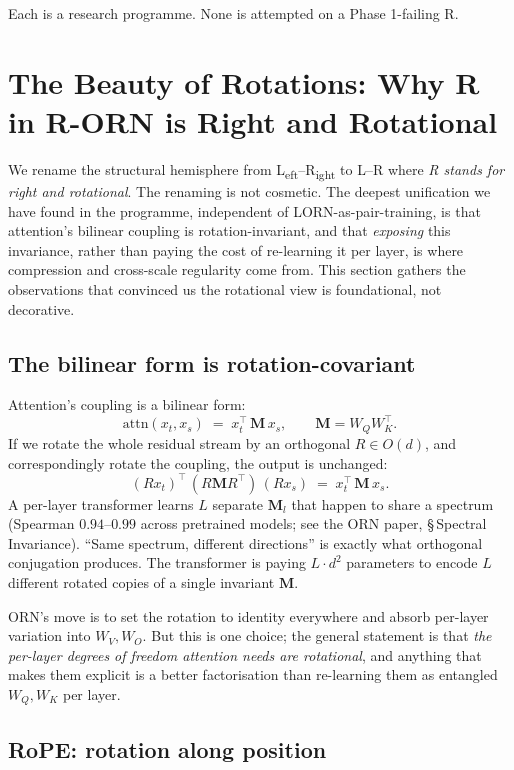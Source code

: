 \documentclass[10pt, twocolumn, a4paper]{article}
\newcommand{\M}{\mathbf{M}}
\begin{document}
Each is a research programme. None is attempted on a Phase 1-failing R.


\section{The Beauty of Rotations: Why R in R-ORN is Right and Rotational}
\label{sec:rotations}

We rename the structural hemisphere from L\textsubscript{eft}--R\textsubscript{ight} to L--R where \emph{R stands for right and rotational}. The renaming is not cosmetic. The deepest unification we have found in the programme, independent of LORN-as-pair-training, is that attention's bilinear coupling is rotation-invariant, and that \emph{exposing} this invariance, rather than paying the cost of re-learning it per layer, is where compression and cross-scale regularity come from. This section gathers the observations that convinced us the rotational view is foundational, not decorative.

\subsection{The bilinear form is rotation-covariant}

Attention's coupling is a bilinear form:
\[
\text{attn}(x_t, x_s) \;=\; x_t^\top\, \M\, x_s, \qquad \M = W_Q W_K^\top.
\]
If we rotate the whole residual stream by an orthogonal $R \in O(d)$, and correspondingly rotate the coupling, the output is unchanged:
\[
(R x_t)^\top\, (R \M R^\top)\, (R x_s) \;=\; x_t^\top\, \M\, x_s.
\]
A per-layer transformer learns $L$ separate $\M_l$ that happen to share a spectrum (Spearman $0.94$--$0.99$ across pretrained models; see the ORN paper, \S\,Spectral Invariance). ``Same spectrum, different directions'' is exactly what orthogonal conjugation produces. The transformer is paying $L \cdot d^2$ parameters to encode $L$ different rotated copies of a single invariant $\M$.

ORN's move is to set the rotation to identity everywhere and absorb per-layer variation into $W_V, W_O$. But this is one choice; the general statement is that \emph{the per-layer degrees of freedom attention needs are rotational}, and anything that makes them explicit is a better factorisation than re-learning them as entangled $W_Q, W_K$ per layer.

\subsection{RoPE: rotation along position}
\end{document}
